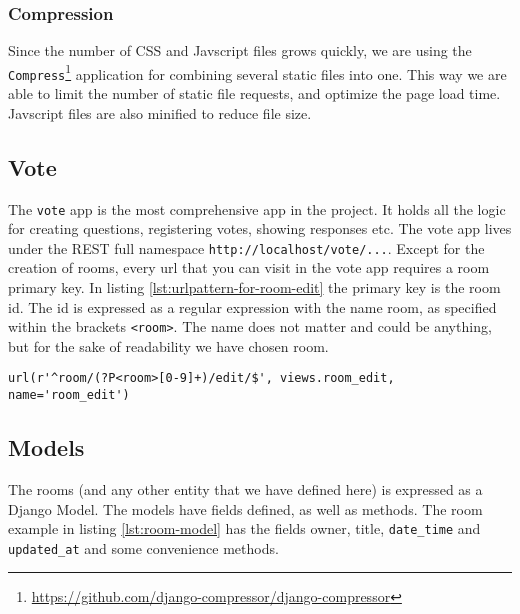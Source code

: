 \subsubsection{Compression}
Since the number of CSS and Javscript files grows quickly, we are using the \texttt{Compress}\footnote{\url{https://github.com/django-compressor/django-compressor}} application for combining several static files into one. This way we are able to limit the number of static file requests, and optimize the page load time. Javscript files are also minified to reduce file size. 


\subsection{Vote}
The \texttt{vote} app is the most comprehensive app in the project. It holds all the logic for creating questions, registering votes, showing responses etc. The vote app lives under the REST full namespace \texttt{http://localhost/vote/...}. Except for the creation of rooms, every url that you can visit in the vote app requires a room primary key. In listing \ref{lst:urlpattern-for-room-edit} the primary key is the room id. The id is expressed as a regular expression with the name room, as specified within the brackets \texttt{<room>}. The name does not matter and could be anything, but for the sake of readability we have chosen room.

\begin{lstlisting}[caption=URL Pattern for Room Edit, label=lst:urlpattern-for-room-edit]
url(r'^room/(?P<room>[0-9]+)/edit/$', views.room_edit, name='room_edit')
\end{lstlisting}


\subsection{Models}
The rooms (and any other entity that we have defined here) is expressed as a Django Model.  
The models have fields defined, as well as methods. The room example in listing \ref{lst:room-model} has the fields owner, title, \texttt{date\_time} and \texttt{updated\_at} and some convenience methods.


